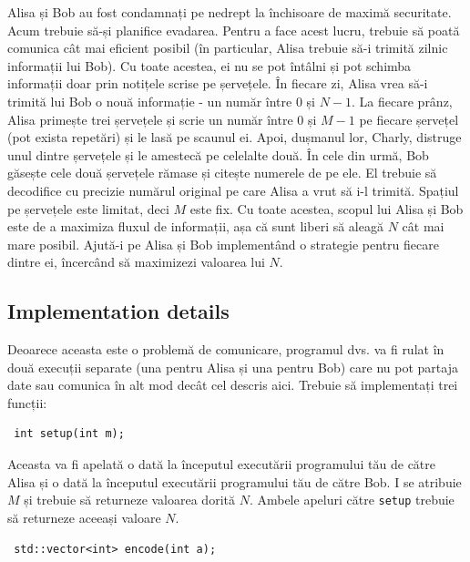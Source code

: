 \documentclass[12pt]{article}
\begin{document}
\renewcommand{\round}{Day 1}
\renewcommand{\problemName}{Task Prison}
\renewcommand{\lang}{English}

\renewcommand{\tl}{$2$ sec.}
\renewcommand{\ml}{$1024$ MB}
\problem{\problemName}

Alisa și Bob au fost condamnați pe nedrept la închisoare de maximă securitate. Acum trebuie să-și planifice evadarea. Pentru a face acest lucru, trebuie să poată comunica cât mai eficient posibil (în particular, Alisa trebuie să-i trimită zilnic informații lui Bob). Cu toate acestea, ei nu se pot întâlni și pot schimba informații doar prin notițele scrise pe șervețele. În fiecare zi, Alisa vrea să-i trimită lui Bob o nouă informație - un număr între $0$ și $N-1$. La fiecare prânz, Alisa primește trei șervețele și scrie un număr între $0$ și $M-1$ pe fiecare șervețel (pot exista repetări) și le lasă pe scaunul ei. Apoi, dușmanul lor, Charly, distruge unul dintre șervețele și le amestecă pe celelalte două. În cele din urmă, Bob găsește cele două șervețele rămase și citește numerele de pe ele. El trebuie să decodifice cu precizie numărul original pe care Alisa a vrut să i-l trimită. Spațiul pe șervețele este limitat, deci $M$ este fix. Cu toate acestea, scopul lui Alisa și Bob este de a maximiza fluxul de informații, așa că sunt liberi să aleagă $N$ cât mai mare posibil. Ajută-i pe Alisa și Bob implementând o strategie pentru fiecare dintre ei, încercând să maximizezi valoarea lui $N$.

\subsection{Implementation details}

Deoarece aceasta este o problemă de comunicare, programul dvs. va fi rulat în două execuții separate (una pentru Alisa și una pentru Bob) care nu pot partaja date sau comunica în alt mod decât cel descris aici. Trebuie să implementați trei funcții:

\begin{lstlisting}
 int setup(int m);
\end{lstlisting}

Aceasta va fi apelată o dată la începutul executării programului tău de către Alisa și o dată la începutul executării programului tău de către Bob. I se atribuie $M$ și trebuie să returneze valoarea dorită $N$. Ambele apeluri către \texttt{setup} trebuie să returneze aceeași valoare $N$.

\begin{lstlisting}
 std::vector<int> encode(int a);
\end{lstlisting}
\end{document}
